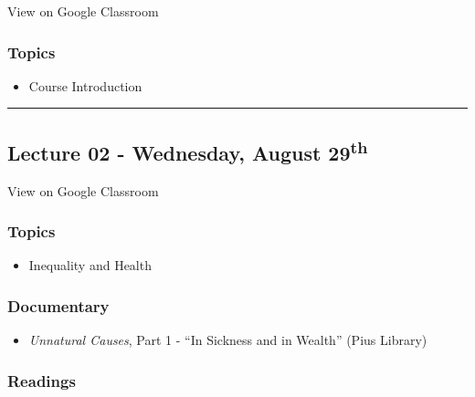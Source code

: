 \documentclass[]{book}
\providecommand{\tightlist}{%
  \setlength{\itemsep}{0pt}\setlength{\parskip}{0pt}}
\theoremstyle{definition}
\theoremstyle{definition}
\theoremstyle{definition}
\theoremstyle{remark}
\begin{document}
View on Google Classroom

\hypertarget{topics}{%
\subsubsection*{Topics}\label{topics}}

\begin{itemize}
\tightlist
\item
  Course Introduction
\end{itemize}

\begin{center}\rule{0.5\linewidth}{\linethickness}\end{center}

\hypertarget{lecture-02---wednesday-august-29th}{%
\subsection*{\texorpdfstring{Lecture 02 - Wednesday, August
29\textsuperscript{th}}{Lecture 02 - Wednesday, August 29th}}\label{lecture-02---wednesday-august-29th}}

View on Google Classroom

\hypertarget{topics-1}{%
\subsubsection*{Topics}\label{topics-1}}

\begin{itemize}
\tightlist
\item
  Inequality and Health
\end{itemize}

\hypertarget{documentary}{%
\subsubsection*{Documentary}\label{documentary}}

\begin{itemize}
\tightlist
\item
  \emph{Unnatural Causes}, Part 1 - ``In Sickness and in Wealth'' (Pius
  Library)
\end{itemize}

\hypertarget{readings-1}{%
\subsubsection*{Readings}\label{readings-1}}
\end{document}
